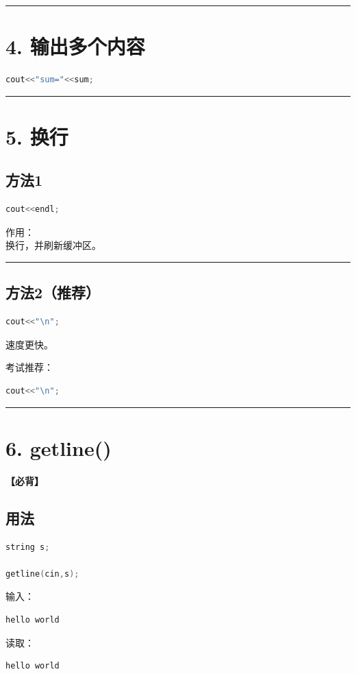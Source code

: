 \documentclass[10pt,twocolumn]{extarticle}
\begin{document}
\noindent\rule{\linewidth}{0.4pt}

\section{4. 输出多个内容}
\begin{lstlisting}[language=C++]
cout<<"sum="<<sum;
\end{lstlisting}

\noindent\rule{\linewidth}{0.4pt}

\section{5. 换行}

\subsection{方法1}
\begin{lstlisting}[language=C++]
cout<<endl;
\end{lstlisting}
作用：\\
换行，并刷新缓冲区。

\noindent\rule{\linewidth}{0.4pt}

\subsection{方法2（推荐）}
\begin{lstlisting}[language=C++]
cout<<"\n";
\end{lstlisting}
速度更快。

考试推荐：
\begin{lstlisting}[language=C++]
cout<<"\n";
\end{lstlisting}

\noindent\rule{\linewidth}{0.4pt}

\section{6. getline()}

\textbf{【必背】}

\subsection{用法}
\begin{lstlisting}[language=C++]
string s;

getline(cin,s);
\end{lstlisting}
输入：
\begin{lstlisting}
hello world
\end{lstlisting}
读取：
\begin{lstlisting}
hello world
\end{lstlisting}
\end{document}
